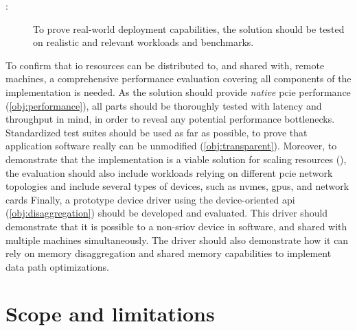 \begin{description}    
    \item[:] To prove real-world deployment capabilities, the solution should be tested on realistic and relevant workloads and benchmarks.
\end{description}
To confirm that \gls{io} resources can be distributed to, and shared with, remote machines, a comprehensive performance evaluation covering all components of the implementation is needed.
As the solution should provide \emph{native} \gls{pcie} performance (\cref{obj:performance}), all parts should be thoroughly tested with latency and throughput in mind, in order to reveal any potential performance bottlenecks.
Standardized test suites should be used as far as possible, to prove that application software really can be unmodified (\cref{obj:transparent}).
%
Moreover, to demonstrate that the implementation is a viable solution for scaling resources (), the evaluation should also include workloads relying on different \gls{pcie} network topologies and include several types of devices, such as \glspl{nvme}, \glspl{gpu}, and network cards
%
Finally, a prototype device driver using the device-oriented \gls{api} (\cref{obj:disaggregation}) should be developed and evaluated. This driver should demonstrate that it is possible to  a non-\gls{sriov} device in software, and shared with multiple machines simultaneously. The driver should also demonstrate how it can rely on memory \gls{disaggregation} and shared memory capabilities to implement data path optimizations.


\section{Scope and limitations}



